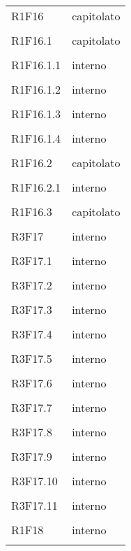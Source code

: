 \documentclass[a4paper]{article}
\begin{document}
\begin{longtable}{ >{\centering}p{}
		>{\centering}p{}}
	R1F16 & capitolato\\\tabularnewline
	
	R1F16.1 & capitolato\\\tabularnewline
	
	R1F16.1.1 & interno\\\tabularnewline
	
	R1F16.1.2 & interno\\\tabularnewline
	
	R1F16.1.3 & interno\\\tabularnewline
	
	R1F16.1.4 & interno\\\tabularnewline
	
	R1F16.2 & capitolato\\\tabularnewline
	
	R1F16.2.1 & interno\\\tabularnewline
	
	R1F16.3 & capitolato\\\tabularnewline
	
	R3F17 & interno\\\tabularnewline
	
	R3F17.1 & interno\\\tabularnewline
	
	R3F17.2 & interno\\\tabularnewline
	
	R3F17.3 & interno\\\tabularnewline
	
	R3F17.4 & interno\\\tabularnewline
	
	R3F17.5 & interno\\\tabularnewline
	
	R3F17.6 & interno\\\tabularnewline
	
	R3F17.7 & interno\\\tabularnewline
	
	R3F17.8 & interno\\\tabularnewline
	
	R3F17.9 & interno\\\tabularnewline
	
	R3F17.10 & interno\\\tabularnewline
	
	R3F17.11 & interno\\\tabularnewline
	
	R1F18 & interno\\\tabularnewline
	

\end{longtable}
\end{document}
